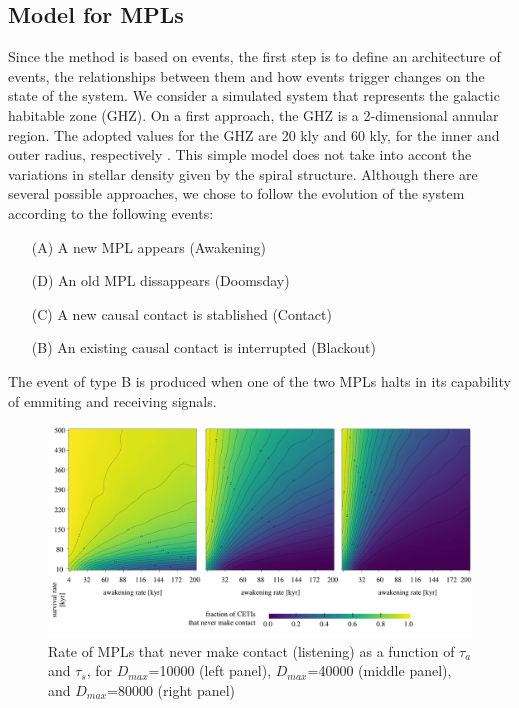 \documentclass[crop]{CSLB}%
\begin{document}



\subsection{Model for MPLs}


Since the method is based on events, the first step is to define an
architecture of events, the relationships between them and how events
trigger changes on the state of the system.
%
We consider a simulated system that represents the galactic habitable
zone (GHZ).
%
On a first approach, the GHZ is a 2-dimensional annular region.
%
The adopted values for the GHZ are 20 kly and 60 kly, for the inner
and outer radius, respectively \citep{lineweaver_galactic_2004}.
%
This simple model does not take into accont the variations in stellar
density given by the spiral structure.
%
Although there are several possible approaches, we chose to follow the
evolution of the system according to the following events:

\begin{enumerate}
   \item[(A)] A new MPL appears (Awakening)
   \item[(D)] An old MPL dissappears (Doomsday)
   \item[(C)] A new causal contact is stablished (Contact)
   \item[(B)] An existing causal contact is interrupted (Blackout)
\end{enumerate}

The event of type B is produced when one of the two MPLs halts in its
capability of emmiting and receiving signals.

                                 
\begin{figure} %
   \centering
   \includegraphics[width=\textwidth]{matrix_1.pdf}
   \caption{Rate of MPLs that never make contact (listening) as a
   function of $\tau_a$ and $\tau_s$, for 
   $D_{max}$=10000 (left panel),
   $D_{max}$=40000 (middle panel), and
   $D_{max}$=80000 (right panel)}
   \label{F_never_contact}
\end{figure}
\end{document}

